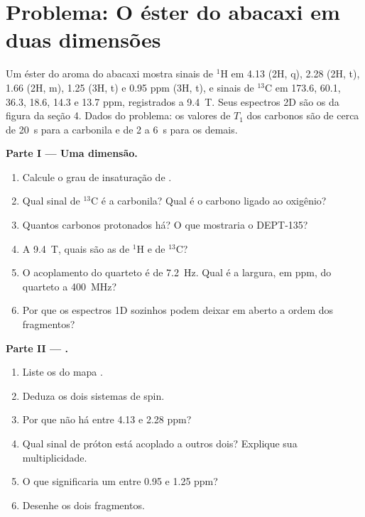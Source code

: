 \section{Problema: O éster do abacaxi em duas dimensões}

\begin{problem}
\label{pb:b3:advanced-nmr:1}
Um éster  do aroma do abacaxi mostra sinais de ${}^1$H em 4.13 (2H,
q), 2.28 (2H, t), 1.66 (2H, m), 1.25 (3H, t) e 0.95 ppm (3H, t), e sinais de ${}^{13}$C
em 173.6, 60.1, 36.3, 18.6, 14.3 e 13.7 ppm, registrados a \qty{9.4}{T}. Seus espectros
2D são os da figura da seção 4. Dados do problema: os valores de $T_1$
dos carbonos são de cerca de \qty{20}{s} para a carbonila e de 2 a \qty{6}{s} para os
demais.

\medskip\noindent\textbf{Parte I --- Uma dimensão.}
\begin{enumerate}
  \item Calcule o grau de insaturação de .
  \item Qual sinal de ${}^{13}$C é a carbonila? Qual é o carbono ligado ao oxigênio?
  \item Quantos carbonos protonados há? O que mostraria o DEPT-135?
  \item A \qty{9.4}{T}, quais são as  de ${}^1$H e de ${}^{13}$C?
  \item O acoplamento do quarteto é de \qty{7.2}{Hz}. Qual é a largura, em ppm, do
        quarteto a \qty{400}{MHz}?
  \item Por que os espectros 1D sozinhos podem deixar em aberto a ordem dos fragmentos?
\end{enumerate}

\medskip\noindent\textbf{Parte II --- .}
\begin{enumerate}[resume]
  \item Liste os  do mapa .
  \item Deduza os dois sistemas de spin.
  \item Por que não há  entre 4.13 e 2.28 ppm?
  \item Qual sinal de próton está acoplado a outros dois? Explique sua multiplicidade.
  \item O que significaria um  entre 0.95 e 1.25 ppm?
  \item Desenhe os dois fragmentos.
\end{enumerate}


\end{problem}
